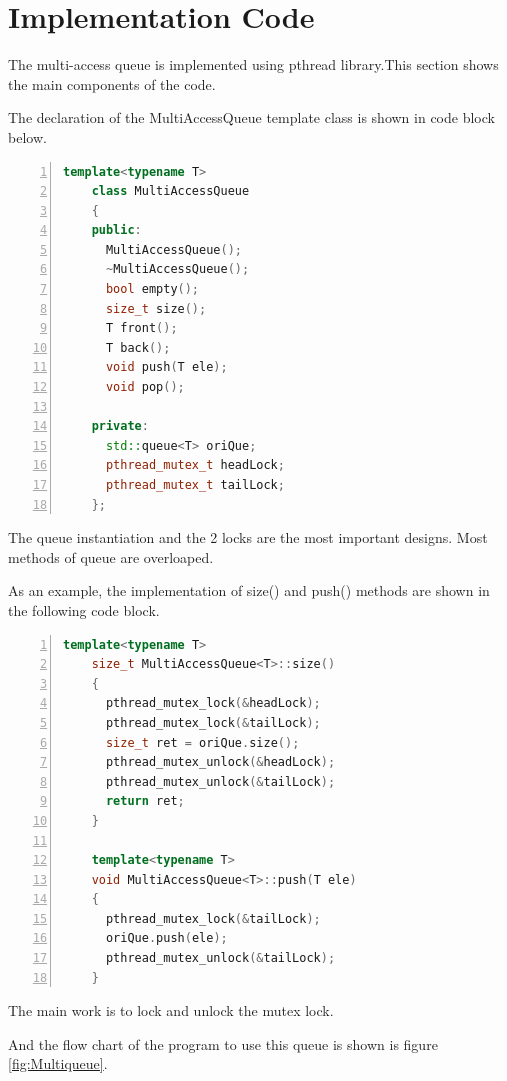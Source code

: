 \documentclass{article}
\begin{document}
	\section{Implementation Code} %
	\label{sec:implementation_code}
	The multi-access queue is implemented using pthread library.This section shows the main components of the code.
	\par The declaration of the MultiAccessQueue template class is shown in code block below.
	\begin{lstlisting}[language=c++, numbers=left,	numberstyle=\tiny,basicstyle=\small]
	template<typename T>
	class MultiAccessQueue
	{
	public:
	  MultiAccessQueue();
	  ~MultiAccessQueue();
	  bool empty();
	  size_t size();
	  T front();
	  T back();
	  void push(T ele);
	  void pop();

	private:
	  std::queue<T> oriQue;
	  pthread_mutex_t headLock;
	  pthread_mutex_t tailLock;
	};
	\end{lstlisting}
	\par The queue instantiation and the 2 locks are the most important designs. Most methods of queue are overloaped.
	\par As an example, the implementation of size() and push() methods are shown in the following code block.
	\begin{lstlisting}[language=c++, numbers=left,	numberstyle=\tiny,basicstyle=\small]
	template<typename T>
	size_t MultiAccessQueue<T>::size()
	{
	  pthread_mutex_lock(&headLock);
	  pthread_mutex_lock(&tailLock);
	  size_t ret = oriQue.size();
	  pthread_mutex_unlock(&headLock);
	  pthread_mutex_unlock(&tailLock);
	  return ret;
	}

	template<typename T>
	void MultiAccessQueue<T>::push(T ele)
	{
	  pthread_mutex_lock(&tailLock);
	  oriQue.push(ele);
	  pthread_mutex_unlock(&tailLock);
	}
	\end{lstlisting}
	\par The main work is to lock and unlock the mutex lock.
	\par And the flow chart of the program to use this queue is shown is figure \ref{fig:Multiqueue}.
\end{document}
